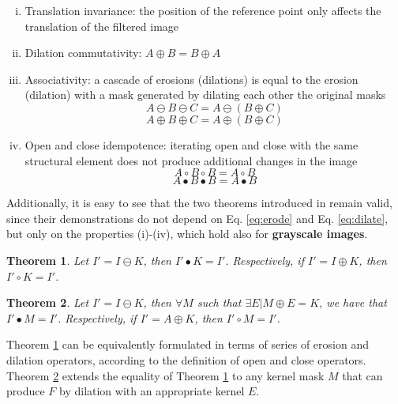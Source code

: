 \documentclass[review]{elsarticle}
\newtheorem{theorem}{Theorem}
\begin{document}
\begin{enumerate}[(i)]
	\item Translation invariance: the position of the reference point only affects the translation of the filtered image
	\item Dilation commutativity: $A\oplus B = B \oplus A$
	\item Associativity: a cascade of erosions (dilations) is equal to the erosion (dilation) with a mask generated by dilating each other the original masks
	\begin{equation}
	A \ominus B \ominus C = A \ominus (B \oplus C)
	\end{equation}
	\begin{equation}
	A \oplus B \oplus C = A \oplus (B \oplus C)
	\end{equation} 
	\item Open and close idempotence: iterating open and close with the same structural element does not produce additional changes in the image
	\begin{equation}
	A \circ B \circ B = A \circ B
	\end{equation}
	\begin{equation}
	A \bullet B \bullet B = A \bullet B
	\end{equation} 
\end{enumerate}

Additionally, it is easy to see that the two theorems introduced in \cite{de2017detecting} remain valid, since their demonstrations do not depend on Eq. \ref{eq:erode} and Eq. \ref{eq:dilate}, but only on the properties (i)-(iv), which hold also for \textbf{grayscale images}.

\begin{theorem}
	\label{theorem_1}
	Let $I' = I \ominus K$, then $I'\bullet K = I'$. Respectively, if $I' = I \oplus K$, then $I'\circ K = I'$.
\end{theorem}

\begin{theorem}
	\label{theorem_2}
	Let $I' = I \ominus K$, then $\forall M$ such that $\exists E | M \oplus E = K$, we have that $I' \bullet M = I'$. Respectively, if $I' = A \oplus K$, then $I' \circ M = I'$.
\end{theorem}

Theorem \ref{theorem_1} can be equivalently formulated in terms of series of erosion and dilation operators, according to the definition of open and close operators. Theorem \ref{theorem_2} extends the equality of Theorem \ref{theorem_1} to any kernel mask $M$ that can produce $F$ by dilation with an appropriate kernel $E$.
\end{document}
